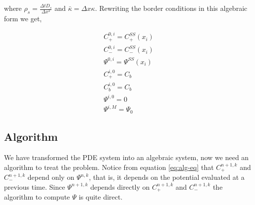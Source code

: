 where $\rho_s = \frac{\Delta t D_s}{\Delta x^2}$ and $\bar{\kappa} =\Delta x\kappa$. Rewriting the border conditions in this algebraic form we get,

\begin{align}
C_+^{0,i}  = C_+^{SS}(x_i) \\
C_-^{0,i}  = C_-^{SS}(x_i) \\
\Psi^{0, i} = \Psi^{SS} (x_i) \\
C_+^{i,0}  = C_b \\
C_b^{i,0}  = C_b \\
\Psi^{i, 0} = 0 \\
\Psi^{i, M} = \Psi_0
\label{eq:alg-border-cond}
\end{align}

\subsection{Algorithm}

We have transformed the PDE system into an algebraic system, now we need an algorithm to treat the problem. Notice from equation \ref{eq:alg-eq} that $C_+^{n+1,k}$ and $C_-^{n+1,k}$ depend only on $\Psi^{n,k}$, that is, it depends on the potential evaluated at a previous time. Since $\Psi^{n+1,k}$ depends directly on $C_+^{n+1,k}$ and  $C_-^{n+1,k}$ the algorithm to compute $\Psi$ is quite direct. 

